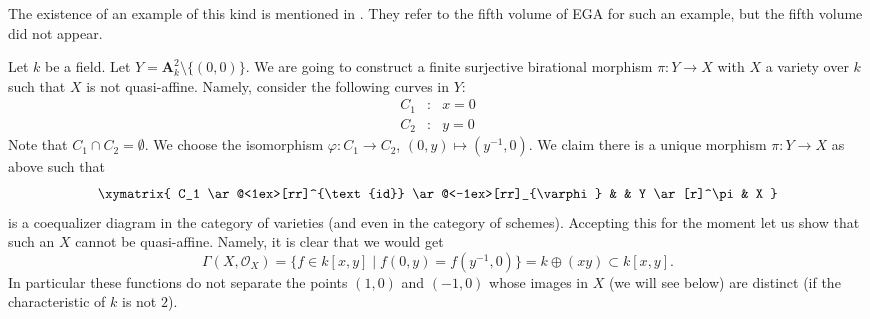 \noindent
The existence of an example of this kind is mentioned in
\cite[II Remark 6.6.13]{EGA}. They refer to the fifth volume of
EGA for such an example, but the fifth volume did not appear.

\medskip\noindent
Let $k$ be a field.
Let $Y = \mathbf{A}^2_k \setminus \{(0, 0)\}$.
We are going to construct a finite surjective birational morphism
$\pi : Y \longrightarrow X$
with $X$ a variety over $k$ such that $X$ is not quasi-affine.
Namely, consider the following curves in $Y$:
$$
\begin{matrix}
C_1 & : & x = 0 \\
C_2 & : & y = 0
\end{matrix}
$$
Note that $C_1 \cap C_2 = \emptyset$. We choose the isomorphism
$\varphi : C_1 \to C_2$, $(0, y) \mapsto (y^{-1}, 0)$.
We claim there is a unique morphism $\pi : Y \to X$ as above
such that
$$
\xymatrix{
C_1
\ar@<1ex>[rr]^{\text{id}} \ar@<-1ex>[rr]_{\varphi}
& &
Y \ar[r]^\pi & X
}
$$
is a coequalizer diagram in the category of varieties (and even in
the category of schemes). Accepting this for the moment let us
show that such an $X$ cannot be quasi-affine. Namely, it is clear
that we would get
$$
\Gamma(X, \mathcal{O}_X) =
\{ f \in k[x, y] \mid f(0, y) = f(y^{-1}, 0)\} =
k \oplus (xy) \subset k[x, y].
$$
In particular these functions do not separate the points $(1, 0)$
and $(-1, 0)$ whose images in $X$ (we will see below) are distinct
(if the characteristic of $k$ is not $2$).

